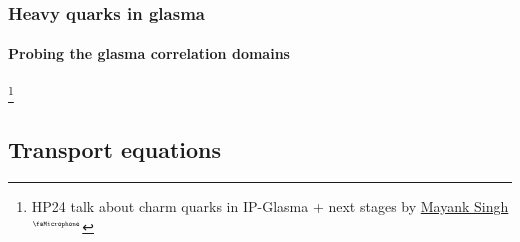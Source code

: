 \documentclass[aspectratio=169,11pt,usenames,dvipsnames]{beamer}
\renewcommand{\thefootnote}{\color{customblue}\faPaperPlaneO}
\newcommand\blfootnote[1]{%
  \begingroup
  \renewcommand\thefootnote{}\footnote{#1}%
  \addtocounter{footnote}{-1}%
  \endgroup
}
\begin{document}
\begin{frame}{}
    \frametitle{\\ Heavy quarks in glasma}
    \framesubtitle{Probing the glasma correlation domains}
    \blfootnote{\scriptsize HP24 talk about charm quarks in IP-Glasma + next stages by \href{https://indico.cern.ch/event/1339555/contributions/6040854/}{{\color{palgold}Mayank Singh$^\text{\tiny\faMicrophone}$}}}
\end{frame}


\subsection{Transport equations}

\end{document}
